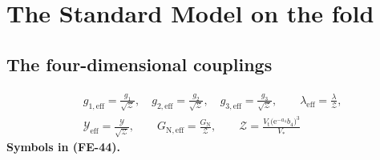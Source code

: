 \documentclass[
  10pt,
]{article}
\begin{document}
\hypertarget{the-standard-model-on-the-fold}{%
\section{The Standard Model on the
fold}\label{the-standard-model-on-the-fold}}

\hypertarget{the-four-dimensional-couplings}{%
\subsection{The four-dimensional
couplings}\label{the-four-dimensional-couplings}}

\[
\begin{aligned}
&g_{1,\mathrm{eff}} = \frac{g_1}{\sqrt{\mathcal{Z}}},\quad g_{2,\mathrm{eff}} = \frac{g_2}{\sqrt{\mathcal{Z}}},\quad g_{3,\mathrm{eff}} = \frac{g_3}{\sqrt{\mathcal{Z}}},\qquad \lambda_{\mathrm{eff}} = \frac{\lambda}{\mathcal{Z}},\\
&\mathcal{Y}_{\mathrm{eff}} = \frac{\mathcal{Y}}{\sqrt{\mathcal{Z}}},\qquad G_{\mathrm{N,eff}} = \frac{G_{\mathrm{N}}}{\mathcal{Z}},\qquad
\mathcal{Z} = \frac{V_{\mathrm{t}}\big(\mathrm{e}^{-a_4}b_4\big)^3}{V_*}
\end{aligned} \tag{FE-44}
\] \textbf{Symbols in (FE-44).}
\end{document}
